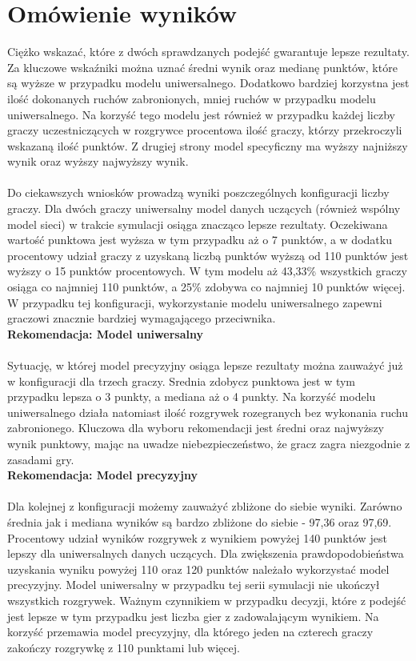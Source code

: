\documentclass[12pt, oneside]{report}
\begin{document}
\section{Omówienie wyników}
Ciężko wskazać, które z dwóch sprawdzanych podejść gwarantuje lepsze rezultaty. Za kluczowe wskaźniki można uznać średni wynik oraz medianę punktów, które są wyższe w przypadku modelu uniwersalnego. Dodatkowo bardziej korzystna jest ilość dokonanych ruchów zabronionych, mniej ruchów w przypadku modelu uniwersalnego. Na korzyść tego modelu jest również w przypadku każdej liczby graczy uczestniczących w rozgrywce procentowa ilość graczy, którzy przekroczyli wskazaną ilość punktów. Z drugiej strony model specyficzny ma wyższy najniższy wynik oraz wyższy najwyższy wynik. \\ \\ 
Do ciekawszych wniosków prowadzą wyniki poszczególnych konfiguracji liczby graczy. Dla dwóch graczy uniwersalny model danych uczących (również wspólny model sieci) w trakcie symulacji osiąga znacząco lepsze rezultaty. Oczekiwana wartość punktowa jest wyższa w tym przypadku aż o 7 punktów, a w dodatku procentowy udział graczy z uzyskaną liczbą punktów wyższą od 110 punktów jest wyższy o 15 punktów procentowych. W tym modelu aż 43,33\% wszystkich graczy osiąga co najmniej 110 punktów, a 25\% zdobywa co najmniej 10 punktów więcej. 
W przypadku tej konfiguracji, wykorzystanie modelu uniwersalnego zapewni graczowi znacznie bardziej wymagającego przeciwnika.
\\
\textbf{Rekomendacja: Model uniwersalny} \\ \\ 
Sytuację, w której model precyzyjny osiąga lepsze rezultaty można zauważyć już w konfiguracji dla trzech graczy. Srednia zdobycz punktowa jest w tym przypadku lepsza o 3 punkty, a mediana aż o 4 punkty. Na korzyść modelu uniwersalnego działa natomiast ilość rozgrywek rozegranych bez wykonania ruchu zabronionego. Kluczowa dla wyboru rekomendacji jest średni oraz najwyższy wynik punktowy, mając na uwadze niebezpieczeństwo, że gracz zagra niezgodnie z zasadami gry.
 \\
\textbf{Rekomendacja: Model precyzyjny} \\ \\
Dla kolejnej z konfiguracji możemy zauważyć zbliżone do siebie wyniki. Zarówno średnia jak i mediana wyników są bardzo zbliżone do siebie - 97,36 oraz 97,69. Procentowy udział wyników rozgrywek z wynikiem powyżej 140 punktów jest lepszy dla uniwersalnych danych uczących. Dla zwiększenia prawdopodobieństwa uzyskania wyniku powyżej 110 oraz 120 punktów należało wykorzystać model precyzyjny. Model uniwersalny w przypadku tej serii symulacji nie ukończył wszystkich rozgrywek. Ważnym czynnikiem w przypadku decyzji, które z podejść jest lepsze w tym przypadku jest liczba gier z zadowalającym wynikiem. Na korzyść przemawia model precyzyjny, dla którego jeden na czterech graczy zakończy rozgrywkę z 110 punktami lub więcej.
\end{document}

